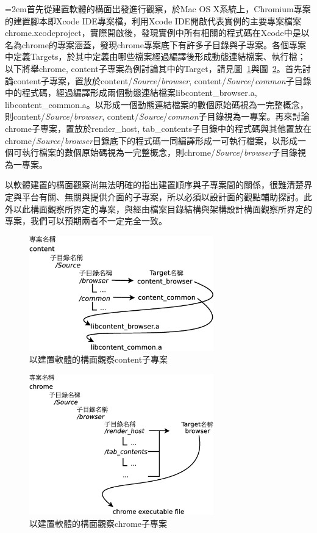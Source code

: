 \documentclass[10pt, twocolumn]{article}
\begin{document}
\parindent=2em首先從建置軟體的構面出發進行觀察，於Mac OS X系統上，Chro\-mium\-專案的建置腳本即Xcode IDE專案檔，利用Xcode IDE\cite{xcode}開啟代表實例的主要專案檔案chrome.\-xcode\-project，實際開啟後，發現實例中所有相關的程式碼在Xcode中是以名為chrome的專案涵蓋，發現chrome專案底下有許多子目錄與子專案。各個專案中定義Targets，於其中定義由哪些檔案經過編譯後形成動態連結檔案、執行檔；以下將舉chrome, content子專案為例討論其中的Target，請見圖~\ref{deploymentview-content}與圖~\ref{deploymentview-chrome}。首先討論content子專案，置放於content\-/\textit{Source}\-/\textit{browser}\-, content\-/\textit{Source}\-/\textit{common}\-子目錄中的程式碼，經過編譯形成兩個動態連結檔案libcontent\_browser.a, libcontent\_common.a。以形成一個動態連結檔案的數個原始碼視為一完整概念，則content\-/\textit{Source}\-/\textit{browser}\-, content\-/\textit{Source}\-/\textit{common}\-子目錄視為一專案。再來討論chrome子專案，置放於render\_host, tab\_contents子目錄中的程式碼與其他置放在chrome\-/\textit{Source}\-/\textit{browser}\-目錄底下的程式碼一同編譯形成一可執行檔案，以形成一個可執行檔案的數個原始碼視為一完整概念，則chrome\-/\textit{Source}\-/\textit{browser}\-子目錄視為一專案。

以軟體建置的構面觀察尚無法明確的指出建置順序與子專案間的關係，很難清楚界定與平台有關、無關與提供介面的子專案，所以必須以設計面的觀點輔助探討。此外以此構面觀察所界定的專案，與經由檔案目錄結構與架構設計構面觀察所界定的專案，我們可以預期兩者不一定完全一致。

\begin{figure}
\begin{center}
\includegraphics[width=8cm]{deploymentview.eps}
\caption{以建置軟體的構面觀察content子專案}
\label{deploymentview-content}
\end{center}
\end{figure}

\begin{figure}
\begin{center}
\includegraphics[width=8cm]{deploymentview-chrome.eps}
\caption{以建置軟體的構面觀察chrome子專案}
\label{deploymentview-chrome}
\end{center}
\end{figure}
\end{document}
